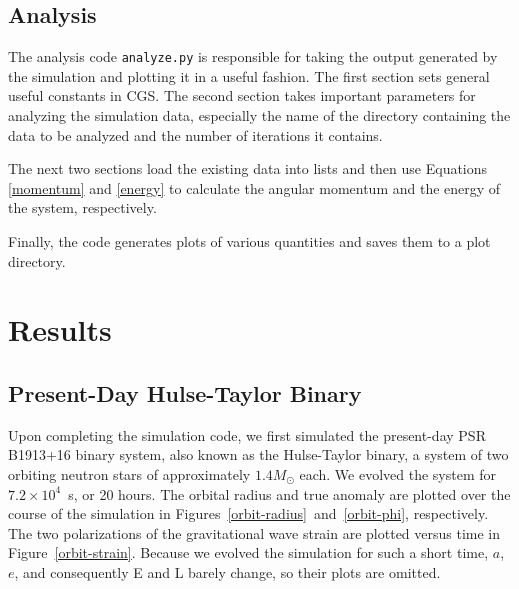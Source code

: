 \documentclass[preprint2]{aastex}
\begin{document}
\subsection{Analysis}

The analysis code \texttt{analyze.py} is responsible for taking the output generated by the simulation and plotting it in a useful fashion. The first section sets general useful constants in CGS. The second section takes important parameters for analyzing the simulation data, especially the name of the directory containing the data to be analyzed and the number of iterations it contains.

The next two sections load the existing data into lists and then use Equations \eqref{momentum} and \eqref{energy} to calculate the angular momentum and the energy of the system, respectively.

Finally, the code generates plots of various quantities and saves them to a plot directory.

\section{Results}

\subsection{Present-Day Hulse-Taylor Binary}

Upon completing the simulation code, we first simulated the present-day PSR B1913+16 binary system, also known as the Hulse-Taylor binary, a system of two orbiting neutron stars of approximately \(1.4 M_\odot\) each. We evolved the system for \(7.2 \times 10^{4}\)~s, or 20 hours. The orbital radius and true anomaly are plotted over the course of the simulation in Figures~\ref{orbit-radius}~and~\ref{orbit-phi}, respectively. The two polarizations of the gravitational wave strain are plotted versus time in Figure~\ref{orbit-strain}. Because we evolved the simulation for such a short time, \(a\), \(e\), and consequently E and L barely change, so their plots are omitted.
\end{document}
